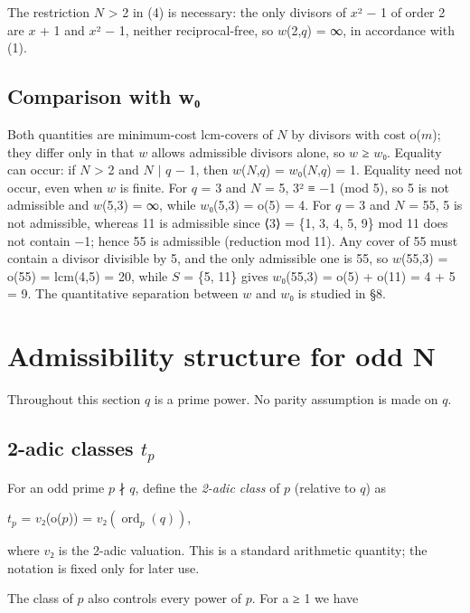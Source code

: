 \documentclass[pdflatex,sn-mathphys-num]{sn-jnl}
\theoremstyle{thmstyleone}
\theoremstyle{thmstylethree}
\begin{document}
The restriction \(N\) \textgreater{} 2 in (4) is necessary: the only divisors of \(x\)² − 1 of order 2 are \(x\) + 1 and \(x\)² − 1, neither reciprocal-free, so \(w\)(2,\(q\)) = ∞, in accordance with (1).

\subsection{Comparison with w₀}

Both quantities are minimum-cost lcm-covers of \(N\) by divisors with cost o(\(m\)); they differ only in that \(w\) allows admissible divisors alone, so \(w\) ≥ \(w\)₀. Equality can occur: if \(N\) \textgreater{} 2 and \(N\) \(\mid\) \(q\) − 1, then \(w\)(\(N\),\(q\)) = \(w\)₀(\(N\),\(q\)) = 1. Equality need not occur, even when \(w\) is finite. For \(q\) = 3 and \(N\) = 5, 3² ≡ −1 (mod 5), so 5 is not admissible and \(w\)(5,3) = ∞, while \(w\)₀(5,3) = o(5) = 4. For \(q\) = 3 and \(N\) = 55, 5 is not admissible, whereas 11 is admissible since ⟨3⟩ = \{1, 3, 4, 5, 9\} mod 11 does not contain −1; hence 55 is admissible (reduction mod 11). Any cover of 55 must contain a divisor divisible by 5, and the only admissible one is 55, so \(w\)(55,3) = o(55) = lcm(4,5) = 20, while \(S\) = \{5, 11\} gives \(w\)₀(55,3) = o(5) + o(11) = 4 + 5 = 9. The quantitative separation between \(w\) and \(w\)₀ is studied in §8.

\section{Admissibility structure for odd N}

Throughout this section \(q\) is a prime power. No parity assumption is made on \(q\).

\subsection{\texorpdfstring{2-adic classes \(t_p\)}{2-adic classes t\_p}}

For an odd prime \(p\) ∤ \(q\), define the \emph{2-adic class} of \(p\) (relative to \(q\)) as

\begin{center}\(t_p\) = \(v\)₂(o(\(p\))) = \(v₂(\operatorname{ord}_p(q))\),\end{center}

where \(v\)₂ is the 2-adic valuation. This is a standard arithmetic quantity; the notation is fixed only for later use.

The class of \(p\) also controls every power of \(p\). For a ≥ 1 we have
\end{document}
